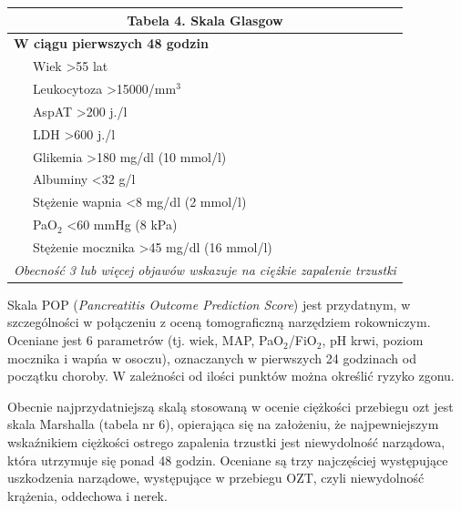 \documentclass[a4paper, 12pt]{report}
\begin{document}
\begin{table}[!h]
\begin{center}
\begin{footnotesize}
\begin{tabular}{|l l|}
\hline
\multicolumn{2}{|c|}{\cellcolor[gray]{0.9} \textbf{Tabela 4. Skala Glasgow}}\\
\hline \hline
\multicolumn{2}{|l|}{\textbf{W ciągu pierwszych 48 godzin}}\\
\hline
 & Wiek >55 lat\\
 & Leukocytoza >15000/mm$^3$\\
 & AspAT >200 j./l\\
 & LDH >600 j./l\\
 & Glikemia >180 mg/dl (10 mmol/l)\\
 & Albuminy <32 g/l\\
 & Stężenie wapnia <8 mg/dl (2 mmol/l)\\
 & PaO$_2$ <60 mmHg (8 kPa)\\
 & Stężenie mocznika >45 mg/dl (16 mmol/l)\\
\hline \hline
\multicolumn{2}{|p{10cm}|}{\textsl{Obecność 3 lub więcej objawów wskazuje na ciężkie
  zapalenie trzustki}}\\
\hline
\end{tabular}
\end{footnotesize}
\end{center}
\end{table}

Skala POP (\textsl{Pancreatitis Outcome Prediction Score}) jest
przydatnym, w szczególności w połączeniu z oceną tomograficzną
narzędziem rokowniczym. Oceniane jest 6
parametrów (tj. wiek, MAP, PaO$_2$/FiO$_2$, pH krwi, poziom mocznika i
wapńa w osoczu), oznaczanych w pierwszych 24 godzinach od początku
choroby. W zależności od ilości punktów można określić ryzyko zgonu.

Obecnie najprzydatniejszą skalą stosowaną w ocenie ciężkości przebiegu
ozt jest skala Marshalla (tabela nr 6), opierająca się na założeniu,
że najpewniejszym wskaźnikiem ciężkości ostrego zapalenia trzustki
jest niewydolność narządowa, która utrzymuje się ponad 48 godzin.
Oceniane są trzy najczęściej występujące uszkodzenia narządowe,
występujące w przebiegu OZT, czyli niewydolność krążenia, oddechowa i
nerek.
\end{document}
